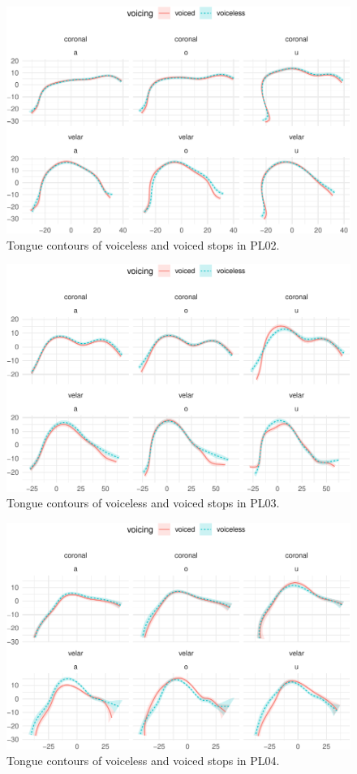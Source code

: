 \documentclass[
  11pt,
]{article}
\begin{document}
\begin{figure}

{\centering \includegraphics[width=.8\textwidth]{2018-polar-gam_files/figure-latex/Figure13} 

}

\caption{Tongue contours of voiceless and voiced stops in PL02.}\label{f:Figure13}
\end{figure}

\begin{figure}

{\centering \includegraphics[width=.8\textwidth]{2018-polar-gam_files/figure-latex/Figure14} 

}

\caption{Tongue contours of voiceless and voiced stops in PL03.}\label{f:Figure14}
\end{figure}

\begin{figure}

{\centering \includegraphics[width=.8\textwidth]{2018-polar-gam_files/figure-latex/Figure15} 

}

\caption{Tongue contours of voiceless and voiced stops in PL04.}\label{f:Figure15}
\end{figure}
\end{document}
